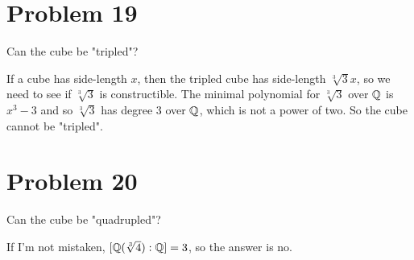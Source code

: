 \documentclass{article}
\begin{document}
\section*{Problem 19}

Can the cube be "tripled"?

If a cube has side-length $x$, then the tripled cube has side-length $\sqrt[3]{3}x$,
so we need to see if $\sqrt[3]{3}$ is constructible.  The minimal polynomial for
$\sqrt[3]{3}$ over $\mathbb{Q}$ is $x^3-3$ and so $\sqrt[3]{3}$ has degree 3 over $\mathbb{Q}$, which
is not a power of two.  So the cube cannot be "tripled".

\section*{Problem 20}

Can the cube be "quadrupled"?

If I'm not mistaken, $[\mathbb{Q}(\sqrt[3]{4}):\mathbb{Q}]=3$, so the answer is no.
\end{document}
